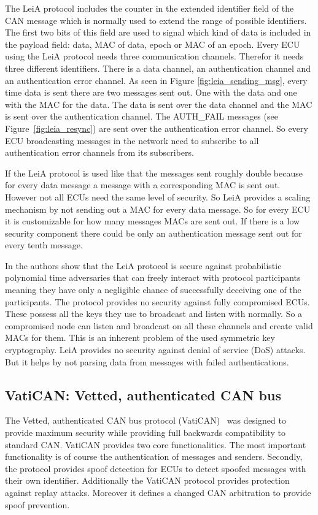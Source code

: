 The LeiA protocol includes the counter in the extended identifier field of the
CAN message which is normally used to extend the range of possible identifiers.
The first two bits of this field are used to signal which kind of data is
included in the payload field: data, MAC of data, epoch or MAC of an epoch.
Every ECU using the LeiA protocol needs three communication channels. Therefor
it needs three different identifiers. There is a data channel, an authentication
channel and an authentication error channel. As seen in Figure
\ref{fig:leia_sending_msg}, every time data is sent there are two messages sent
out. One with the data and one with the MAC for the data. The data is sent over
the data channel and the MAC is sent over the authentication channel. The
AUTH\_FAIL messages (see Figure~\ref{fig:leia_resync}) are sent over the
authentication error channel. So every ECU broadcasting messages in the network
need to subscribe to all authentication error channels from its subscribers.

If the LeiA protocol is used like that the messages sent roughly double because
for every data message a message with a corresponding MAC is sent out. However
not all ECUs need the same level of security. So LeiA provides a scaling
mechanism by not sending out a MAC for every data message. So for every ECU it
is customizable for how many messages MACs are sent out. If there is a low
security component there could be only an authentication message sent out for
every tenth message.

In \cite{Radu2016} the authors show that the LeiA protocol is secure against
probabilistic polynomial time adversaries that can freely interact with protocol
participants meaning they have only a negligible chance of successfully
deceiving one of the participants. The protocol provides no security against
fully compromised ECUs. These possess all the keys they use to broadcast and
listen with normally. So a compromised node can listen and broadcast on all
these channels and create valid MACs for them. This is an inherent problem of
the used symmetric key cryptography. LeiA provides no security against denial of
service (DoS) attacks. But it helps by not parsing data from messages with
failed authentications.

\subsection{VatiCAN: Vetted, authenticated CAN bus}\label{subsec:vatican}

The Vetted, authenticated CAN bus protocol (VatiCAN)~\cite{Nurnberger2016} was
designed to provide maximum security while providing full backwards
compatibility to standard CAN\@. VatiCAN provides two core functionalities. The
most important functionality is of course the authentication of messages and
senders. Secondly, the protocol provides spoof detection for ECUs to detect
spoofed messages with their own identifier. Additionally the VatiCAN protocol
provides protection against replay attacks. Moreover it defines a changed CAN
arbitration to provide spoof prevention.

